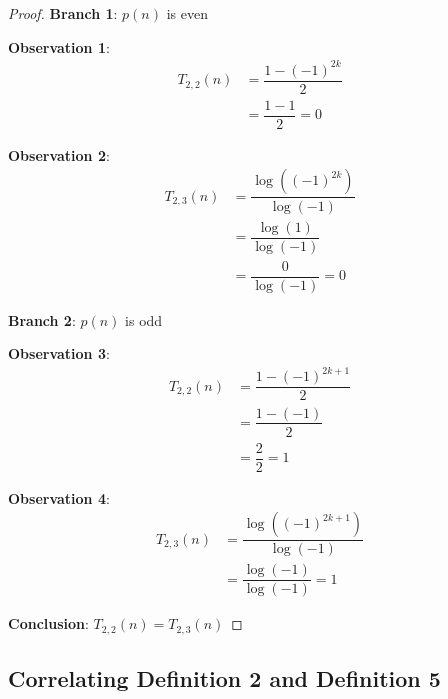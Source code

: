 \documentclass[conference]{IEEEtran}
\begin{document}
\begin{proof}
\par\noindent\par
    \textbf{Branch 1}: $p(n)$ is even

    \textbf{Observation 1}:\begin{equation}\begin{aligned}
    T_{2,2}(n) &= \dfrac{1 - (-1)^{2k}}{2}\\
               &= \dfrac{1 - 1}{2} = 0
    \end{aligned}
    \end{equation}

    \textbf{Observation 2}: \begin{equation}\begin{aligned}
    T_{2,3}(n) &= \dfrac{\log((-1)^{2k})}{\log(-1)} \\
               &= \dfrac{\log(1)}{\log(-1)} \\
               &= \dfrac{0}{\log(-1)} = 0
    \end{aligned}
    \end{equation}

    \textbf{Branch 2}: $p(n)$ is odd

    \textbf{Observation 3}:\begin{equation}\begin{aligned}
    T_{2,2}(n) &= \dfrac{1 - (-1)^{2k+1}}{2} \\
               &= \dfrac{1 - (-1)}{2}\\ 
               &= \dfrac{2}{2} = 1
    \end{aligned}
    \end{equation}

    \textbf{Observation 4}:\begin{equation}\begin{aligned}
    T_{2,3}(n) &= \dfrac{\log((-1)^{2k+1})}{\log(-1)}\\
    &= \dfrac{\log(-1)}{\log(-1)} = 1
    \end{aligned}
    \end{equation}

    \textbf{Conclusion}: $T_{2,2}(n) = T_{2,3}(n)$
\end{proof}

\subsection{Correlating Definition 2 and Definition 5}
\end{document}
